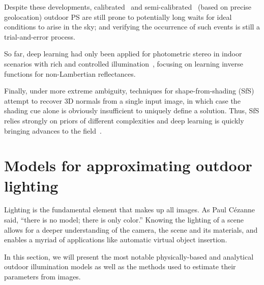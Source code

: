 Despite these developments, calibrated~\cite{yu-iccp-13} and semi-calibrated~\cite{jung-cvpr-15} (based on precise geolocation) outdoor PS are still prone to potentially long waits for ideal conditions to arise in the sky; and verifying the occurrence of such events is still a trial-and-error process.

So far, deep learning had only been applied for photometric stereo in indoor scenarios with rich and controlled illumination~\cite{yu-iccv-17,santo-iccv-17,taniai-arxiv-18,shi-tpami-18}, focusing on learning inverse functions for non-Lambertian reflectances.



Finally, under more extreme ambiguity, techniques for shape-from-shading (SfS)~\cite{Horn1989,Zhang1999,Langer1994,oxholm-eccv-12,johnson-cvpr-11,barron-pami-15} attempt to recover 3D normals from a single input image, in which case the shading cue alone is obviously insufficient to uniquely define a solution. Thus, SfS relies strongly on priors of different complexities and deep learning is quickly bringing advances to the field~\cite{eigen-iccv-15,shu-cvpr-17,wu-nips-17,shu-cvpr-17}.




\section{Models for approximating outdoor lighting}

Lighting is the fundamental element that makes up all images. As Paul Cézanne said, ``there is no model; there is only color.'' Knowing the lighting of a scene allows for a deeper understanding of the camera, the scene and its materials, and enables a myriad of applications like automatic virtual object insertion.

In this section, we will present the most notable physically-based and analytical outdoor illumination models as well as the methods used to estimate their parameters from images.

